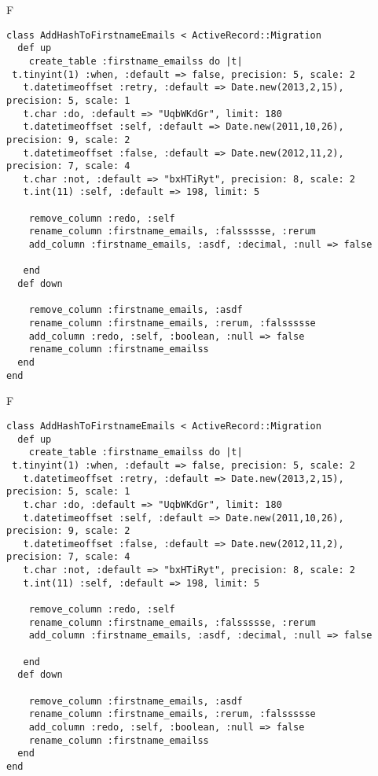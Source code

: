 F
\begin{verbatim}
class AddHashToFirstnameEmails < ActiveRecord::Migration
  def up
    create_table :firstname_emailss do |t| 
 t.tinyint(1) :when, :default => false, precision: 5, scale: 2
   t.datetimeoffset :retry, :default => Date.new(2013,2,15), precision: 5, scale: 1
   t.char :do, :default => "UqbWKdGr", limit: 180
   t.datetimeoffset :self, :default => Date.new(2011,10,26), precision: 9, scale: 2
   t.datetimeoffset :false, :default => Date.new(2012,11,2), precision: 7, scale: 4
   t.char :not, :default => "bxHTiRyt", precision: 8, scale: 2
   t.int(11) :self, :default => 198, limit: 5

    remove_column :redo, :self
    rename_column :firstname_emails, :falssssse, :rerum
    add_column :firstname_emails, :asdf, :decimal, :null => false

   end
  def down

    remove_column :firstname_emails, :asdf
    rename_column :firstname_emails, :rerum, :falssssse
    add_column :redo, :self, :boolean, :null => false
    rename_column :firstname_emailss
  end
end
\end{verbatim}

F
\begin{verbatim}
class AddHashToFirstnameEmails < ActiveRecord::Migration
  def up
    create_table :firstname_emailss do |t| 
 t.tinyint(1) :when, :default => false, precision: 5, scale: 2
   t.datetimeoffset :retry, :default => Date.new(2013,2,15), precision: 5, scale: 1
   t.char :do, :default => "UqbWKdGr", limit: 180
   t.datetimeoffset :self, :default => Date.new(2011,10,26), precision: 9, scale: 2
   t.datetimeoffset :false, :default => Date.new(2012,11,2), precision: 7, scale: 4
   t.char :not, :default => "bxHTiRyt", precision: 8, scale: 2
   t.int(11) :self, :default => 198, limit: 5

    remove_column :redo, :self
    rename_column :firstname_emails, :falssssse, :rerum
    add_column :firstname_emails, :asdf, :decimal, :null => false

   end
  def down

    remove_column :firstname_emails, :asdf
    rename_column :firstname_emails, :rerum, :falssssse
    add_column :redo, :self, :boolean, :null => false
    rename_column :firstname_emailss
  end
end
\end{verbatim}

